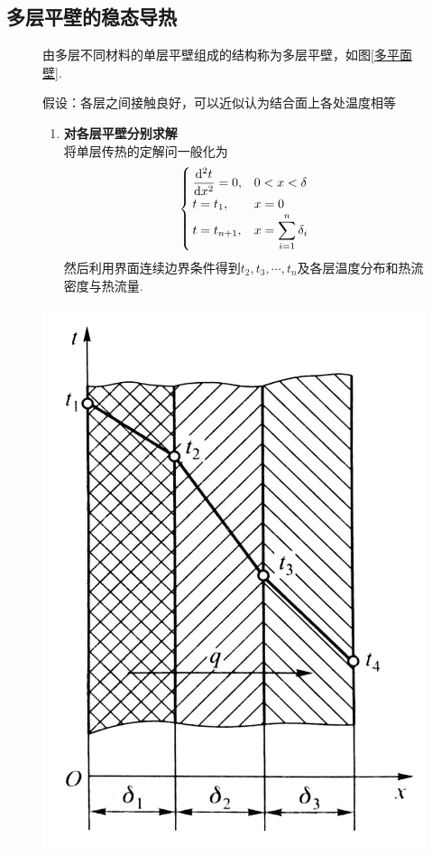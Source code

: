 \subsection{多层平壁的稳态导热}
\vspace*{-3em}
	\begin{figure}[!htb]
		\begin{minipage}{0.7\linewidth}
			由多层不同材料的单层平壁组成的结构称为多层平壁，如图\ref{多平面壁}.
			
			假设：各层之间接触良好，可以近似认为结合面上各处温度相等
			\begin{enumerate}[\textbf{解法} 1]
				\item \textbf{对各层平壁分别求解}\\
				将单层传热的定解问一般化为
				\begin{align}
					\begin{cases}
						\, \dfrac{{\rm{d}}^2 t}{{\rm{d}} x^2} = 0, &  0< x< \delta\\
						\, t = t_1, & x = 0\\
						\, t = t_{n + 1}, & \displaystyle x = \sum_{i = 1}^n\delta_i
					\end{cases}
				\end{align}
				然后利用界面连续边界条件得到$t_2, t_3, \cdots , t_n$及各层温度分布和热流密度与热流量.
			\end{enumerate}
		\end{minipage}
	\begin{minipage}{0.3\linewidth}
		\centering
		\includegraphics[width=\linewidth]{pic/多平面壁.jpeg}

\end{minipage}
\end{figure}
